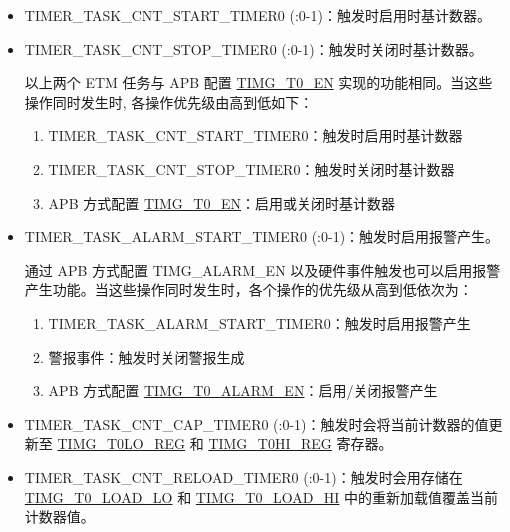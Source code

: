 \documentclass[main\_\_CN.tex]{subfiles}
\begin{document}
\begin{itemize}

\item TIMER\_TASK\_CNT\_START\_TIMER0 (:0-1)：触发时启用时基计数器。
\item TIMER\_TASK\_CNT\_STOP\_TIMER0 (:0-1)：触发时关闭时基计数器。

\begin{tiplisting}
以上两个 ETM 任务与 APB 配置 \hyperref[fielddesc:TIMGTXEN]{TIMG\_T0\_EN} 实现的功能相同。当这些操作同时发生时, 各操作优先级由高到低如下：

\begin{enumerate}
    \item TIMER\_TASK\_CNT\_START\_TIMER0：触发时启用时基计数器
    \item TIMER\_TASK\_CNT\_STOP\_TIMER0：触发时关闭时基计数器
    \item APB 方式配置 \hyperref[fielddesc:TIMGTXEN]{TIMG\_T0\_EN}：启用或关闭时基计数器
\end{enumerate}
\end{tiplisting}

\item TIMER\_TASK\_ALARM\_START\_TIMER0 (:0-1)：触发时启用报警产生。

\begin{tiplisting}
通过 APB 方式配置 TIMG\_ALARM\_EN 以及硬件事件触发也可以启用报警产生功能。当这些操作同时发生时，各个操作的优先级从高到低依次为：

\begin{enumerate}
    \item TIMER\_TASK\_ALARM\_START\_TIMER0：触发时启用报警产生
    \item 警报事件：触发时关闭警报生成
    \item APB 方式配置 \hyperref[fielddesc:TIMGTXALARMEN]{TIMG\_T0\_ALARM\_EN}：启用/关闭报警产生
\end{enumerate}
\end{tiplisting}

\item TIMER\_TASK\_CNT\_CAP\_TIMER0 (:0-1)：触发时会将当前计数器的值更新至 \hyperref[regdesc:TIMGTXLOREG]{TIMG\_T0LO\_REG} 和 \hyperref[regdesc:TIMGTXHIREG]{TIMG\_T0HI\_REG} 寄存器。
\item TIMER\_TASK\_CNT\_RELOAD\_TIMER0 (:0-1)：触发时会用存储在 \hyperref[fielddesc:TIMGTXLOADLO]{TIMG\_T0\_LOAD\_LO} 和 \hyperref[fielddesc:TIMGTXLOADHI]{TIMG\_T0\_LOAD\_HI} 中的重新加载值覆盖当前计数器值。
\end{itemize}
\end{document}

